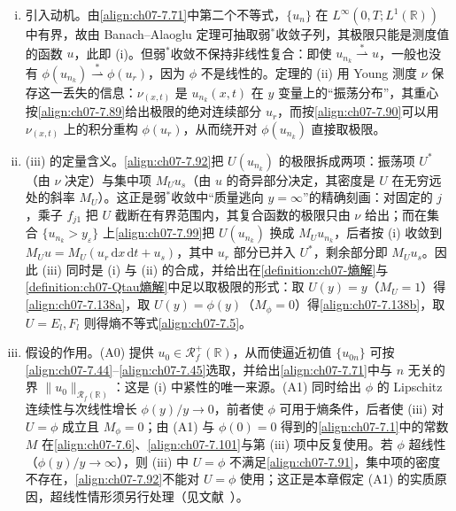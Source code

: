 \documentclass[../../main.tex]{subfiles}%
\begin{document}
\begin{remark}\label{remark:ch07-7.5.1动机}
\begin{enumerate}[(i)]
\item 引入动机。由\eqref{align:ch07-7.71}中第二个不等式，$\{u_n\}$ 在 $L^\infty(0,T;L^1(\mathbb{R}))$ 中有界，故由 Banach--Alaoglu 定理可抽取弱$^*$收敛子列，其极限只能是测度值的函数 $u$，此即 (i)。但弱$^*$收敛不保持非线性复合：即使 $u_{n_k}\stackrel{*}{\rightharpoonup}u$，一般也没有 $\phi(u_{n_k})\stackrel{*}{\rightharpoonup}\phi(u_r)$，因为 $\phi$ 不是线性的。定理的 (ii) 用 Young 测度 $\nu$ 保存这一丢失的信息：$\nu_{(x,t)}$ 是 $u_{n_k}(x,t)$ 在 $y$ 变量上的“振荡分布”，其重心按\eqref{align:ch07-7.89}给出极限的绝对连续部分 $u_r$，而按\eqref{align:ch07-7.90}可以用 $\nu_{(x,t)}$ 上的积分重构 $\phi(u_r)$，从而绕开对 $\phi(u_{n_k})$ 直接取极限。
\item (iii) 的定量含义。\eqref{align:ch07-7.92}把 $U(u_{n_k})$ 的极限拆成两项：振荡项 $U^*$（由 $\nu$ 决定）与集中项 $M_Uu_s$（由 $u$ 的奇异部分决定，其密度是 $U$ 在无穷远处的斜率 $M_U$）。这正是弱$^*$收敛中“质量逃向 $y=\infty$”的精确刻画：对固定的 $j$，乘子 $f_{j1}$ 把 $U$ 截断在有界范围内，其复合函数的极限只由 $\nu$ 给出；而在集合 $\{u_{n_k}>y_\varepsilon\}$ 上\eqref{align:ch07-7.99}把 $U(u_{n_k})$ 换成 $M_Uu_{n_k}$，后者按 (i) 收敛到 $M_Uu=M_U(u_r\,\mathrm{d}x\,\mathrm{d}t+u_s)$，其中 $u_r$ 部分已并入 $U^*$，剩余部分即 $M_Uu_s$。因此 (iii) 同时是 (i) 与 (ii) 的合成，并给出在\cref{definition:ch07-熵解}与\cref{definition:ch07-Qtau熵解}中足以取极限的形式：取 $U(y)=y$（$M_U=1$）得\eqref{align:ch07-7.138a}，取 $U(y)=\phi(y)$（$M_\phi=0$）得\eqref{align:ch07-7.138b}，取 $U=E_l,F_l$ 则得熵不等式\eqref{align:ch07-7.5}。
\item 假设的作用。(A0) 提供 $u_0\in\mathscr{R}_f^+(\mathbb{R})$，从而使逼近初值 $\{u_{0n}\}$ 可按\eqref{align:ch07-7.44}--\eqref{align:ch07-7.45}选取，并给出\eqref{align:ch07-7.71}中与 $n$ 无关的界 $\|u_0\|_{\mathscr{R}_f(\mathbb{R})}$：这是 (i) 中紧性的唯一来源。(A1) 同时给出 $\phi$ 的 Lipschitz 连续性与次线性增长 $\phi(y)/y\to0$，前者使 $\phi$ 可用于熵条件，后者使 (iii) 对 $U=\phi$ 成立且 $M_\phi=0$；由 (A1) 与 $\phi(0)=0$ 得到的\eqref{align:ch07-7.1}中的常数 $M$ 在\eqref{align:ch07-7.6}、\eqref{align:ch07-7.101}与第 (iii) 项中反复使用。若 $\phi$ 超线性（$\phi(y)/y\to\infty$），则 (iii) 中 $U=\phi$ 不满足\eqref{align:ch07-7.91}，集中项的密度不存在，\eqref{align:ch07-7.92}不能对 $U=\phi$ 使用；这正是本章假定 (A1) 的实质原因，超线性情形须另行处理（见文献~\cite{ref67}）。

\end{enumerate}
\end{remark}
\end{document}
